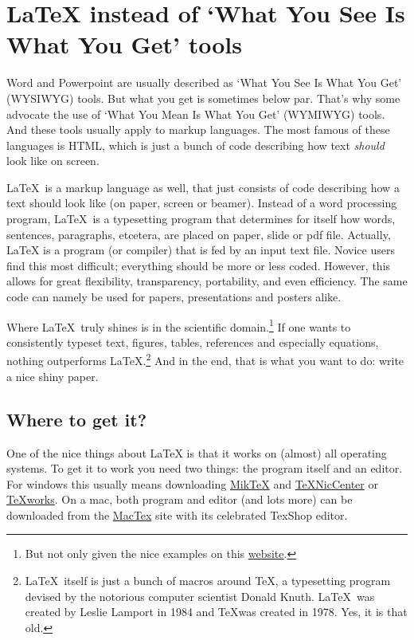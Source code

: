 \documentclass[preprint,authoryear,5p]{elsarticle}
\begin{document}
\section{\LaTeX \: instead of `What You See Is What You Get' tools} Word and Powerpoint are usually described as `What You See Is What You Get' (WYSIWYG) tools. But what you get is sometimes below par. That's why some advocate the use of `What You Mean Is What You Get' (WYMIWYG) tools. And these tools usually apply to markup languages. The most famous of these languages is HTML, which is just a bunch of code describing how text \emph{should} look like on screen. 

\LaTeX \ is a markup language as well, that just consists of code describing how a text should look like (on paper, screen or beamer). Instead of a word processing program, \LaTeX \ is a typesetting program that determines for itself how words, sentences, paragraphs, etcetera, are placed on paper, slide or pdf file. Actually, \LaTeX{} is a program (or compiler) that is fed by an input text file. Novice users find this most difficult; everything should be more or less coded. However, this allows for great flexibility, transparency, portability, and even efficiency. The same code can namely be used for papers, presentations and posters alike.

Where \LaTeX \ truly shines is in the scientific domain.\footnote{But not only given the nice examples on this \href{http://www.tug.org/texshowcase/}{website}.} If one wants to consistently typeset text, figures, tables, references and especially equations, nothing outperforms {\LaTeX}.\footnote{\LaTeX \ itself is just a bunch of macros around \TeX, a typesetting program devised by the notorious computer scientist Donald Knuth. \LaTeX\ was created by Leslie Lamport in 1984 and \TeX was created in 1978. Yes, it is that old.} And in the end, that is what you want to do: write a nice shiny paper. 

\subsection{Where to get it?}

One of the nice things about {\LaTeX} is that it works on (almost) all operating systems. To get it to work you need two things: the program itself and an editor. For windows this usually means downloading \href{http://miktex.org/}{MikTeX} and \href{http://www.texniccenter.org/}{TeXNicCenter} or \href{http://www.tug.org/texworks//}{TeXworks}. On a mac, both program and editor (and lots more) can be downloaded from the \href{http://tug.org/mactex/}{MacTex} site with its celebrated TexShop editor. 
\end{document}
